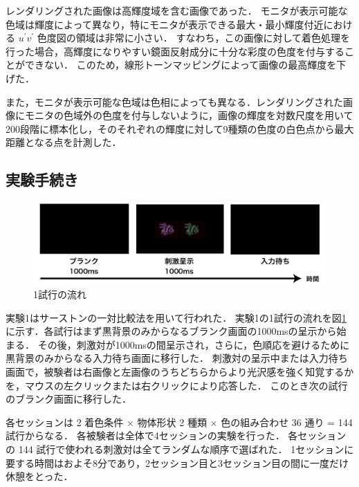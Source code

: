             レンダリングされた画像は高輝度域を含む画像であった．
            モニタが表示可能な色域は輝度によって異なり，特にモニタが表示できる最大・最小輝度付近における $u^{\prime}v^{\prime}$ 色度図の領域は非常に小さい．
            すなわち，この画像に対して着色処理を行った場合，高輝度になりやすい鏡面反射成分に十分な彩度の色度を付与することができない．
            このため，線形トーンマッピングによって画像の最高輝度を下げた．

            また，モニタが表示可能な色域は色相によっても異なる．レンダリングされた画像にモニタの色域外の色度を付与しないように，画像の輝度を対数尺度を用いて200段階に標本化し，そのそれぞれの輝度に対して9種類の色度の白色点から最大距離となる点を計測した．


    \subsection{実験手続き}

        \begin{figure}[h]
            \centering
            \includegraphics[width=14.0cm]{./img/ex1_procedure.png}
            \caption{1試行の流れ}
            \label{ex1_procedure}
        \end{figure}

        実験1はサーストンの一対比較法を用いて行われた．
        実験1の1試行の流れを図\ref{ex1_procedure}に示す．各試行はまず黒背景のみからなるブランク画面の1000msの呈示から始まる．
        その後，刺激対が1000msの間呈示され，さらに，色順応を避けるために黒背景のみからなる入力待ち画面に移行した．
        刺激対の呈示中または入力待ち画面で，被験者は右画像と左画像のうちどちらからより光沢感を強く知覚するかを，マウスの左クリックまたは右クリックにより応答した．
        このとき次の試行のブランク画面に移行した．

        各セッションは 2 着色条件 $\times$ 物体形状 2 種類 $\times$ 色の組み合わせ 36 通り = 144 試行からなる．
        各被験者は全体で4セッションの実験を行った．
        各セッションの 144 試行で使われる刺激対は全てランダムな順序で選ばれた．
        1セッションに要する時間はおよそ8分であり，2セッション目と3セッション目の間に一度だけ休憩をとった．




